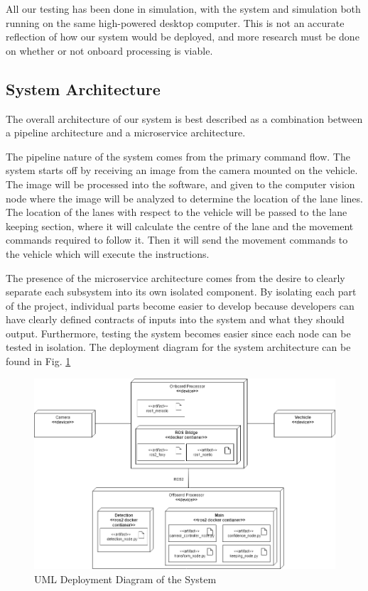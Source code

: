 \documentclass[titlepage,draft]{article}
\begin{document}
All our testing has been done in simulation, with the system and simulation both running on the same high-powered desktop computer. This is not an accurate reflection of how our system would be deployed, and more research must be done on whether or not onboard processing is viable.

\subsection{System Architecture}
The overall architecture of our system is best described as a combination between a pipeline architecture and a microservice architecture.

The pipeline nature of the system comes from the primary command flow. The system starts off by receiving an image from the camera mounted on the vehicle. The image will be processed into the software, and given to the computer vision node where the image will be analyzed to determine the location of the lane lines. The location of the lanes with respect to the vehicle will be passed to the lane keeping section, where it will calculate the centre of the lane and the movement commands required to follow it. Then it will send the movement commands to the vehicle which will execute the instructions.

The presence of the microservice architecture comes from the desire to clearly separate each subsystem into its own isolated component. By isolating each part of the project, individual parts become easier to develop because developers can have clearly defined contracts of inputs into the system and what they should output. Furthermore, testing the system becomes easier since each node can be tested in isolation. The deployment diagram for the system architecture can be found in Fig. \ref{fig:deployment}

\begin{figure}
	\centering
	\includegraphics[width=6in]{deployment_uml}
	\caption{UML Deployment Diagram of the System}
	\label{fig:deployment}
\end{figure}
\end{document}
